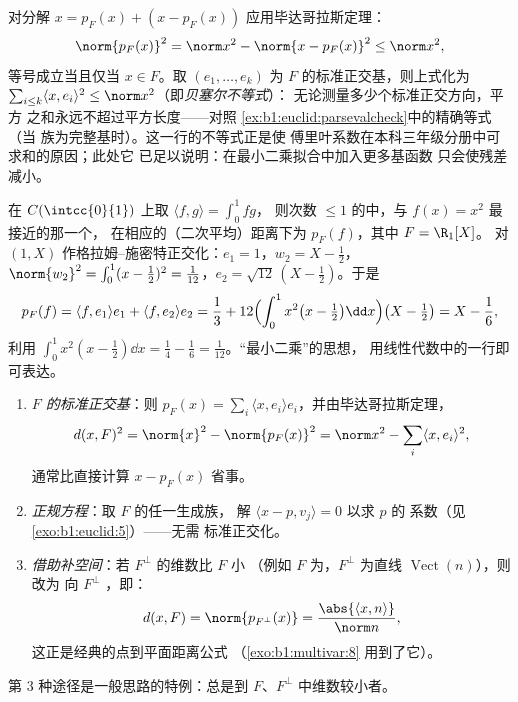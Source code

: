 \begin{example}[投影不会使长度变长]
\label{ex:b1:euclid:bessel}
对分解 $x = p_F(x) + (x - p_F(x))$ 应用毕达哥拉斯定理：
\[
\norm{p_F(x)}^2 = \norm x^2 - \norm{x - p_F(x)}^2 \leq
\norm x^2 ,
\]
等号成立当且仅当 $x \in F$。取 $(e_1,
\dots, e_k)$ 为 $F$ 的标准正交基，则上式化为 $\sum_{i \leq k}\langle x,
e_i\rangle^2 \leq \norm x^2$（即\emph{贝塞尔不等式}）：
无论测量多少个标准正交方向，平方
之和永远不超过平方长度——对照
\cref{ex:b1:euclid:parsevalcheck}中的精确等式（当
族为完整基时）。这一行的不等式正是使
傅里叶系数在本科三年级分册中可求和的原因；此处它
已足以说明：在最小二乘拟合中加入更多基函数
只会使残差减小。
\end{example}

\begin{example}[最佳二次逼近]\label{ex:b1:euclid:bestapprox}
在 $C(\intcc{0}{1})$ 上取 $\langle f, g\rangle = \int_0^1 fg$，
则次数 $\leq 1$ 的中，与 $f(x) = x^2$ 最接近的那一个，
在相应的（二次平均）距离下为 $p_F(f)$，其中 $F = \R_1[X]$。
对 $(1, X)$ 作格拉姆–施密特正交化：$e_1 = 1$，$w_2 = X - \frac12$，
$\norm{w_2}^2 = \int_0^1 (x - \frac12)^2 = \frac{1}{12}$，$e_2 =
\sqrt{12}\,(X - \tfrac12)$。于是
\[
p_F(f) = \langle f, e_1\rangle e_1 + \langle f, e_2\rangle e_2
= \frac13 + 12\Bigl(\int_0^1 x^2\bigl(x - \tfrac12\bigr)\dd
x\Bigr)\bigl(X - \tfrac12\bigr)
= X - \frac{1}{6},
\]
利用 $\int_0^1 x^2(x - \frac12)\dd x = \frac14 - \frac16 =
\frac{1}{12}$。“最小二乘”的思想，
用线性代数中的一行即可表达。
\end{example}

\begin{method}
\label{met:b1:euclid:distance}
\begin{enumerate}
  \item \emph{$F$ 的标准正交基}：则 $p_F(x) = \sum_i
        \langle x, e_i\rangle e_i$，并由毕达哥拉斯定理，
        \[
        d(x, F)^2 = \norm{x}^2 - \norm{p_F(x)}^2
        = \norm x^2 - \sum_i \langle x, e_i\rangle^2 ,
        \]
        通常比直接计算 $x - p_F(x)$ 省事。
  \item \emph{正规方程}：取 $F$ 的任一生成族，
        解 $\langle x - p, v_j\rangle = 0$ 以求 $p$ 的
        系数（见\cref{exo:b1:euclid:5}）——无需
        标准正交化。
  \item \emph{借助补空间}：若 $F^\perp$ 的维数比 $F$ 小
        （例如 $F$ 为，$F^\perp$ 为直线
        $\operatorname{Vect}(n)$），则改为
        向 $F^\perp$ ，即：
        \[
        d(x, F) = \norm{p_{F^\perp}(x)} =
        \frac{\abs{\langle x, n\rangle}}{\norm n} ,
        \]
        这正是经典的点到平面距离公式
        （\cref{exo:b1:multivar:8} 用到了它）。
\end{enumerate}
第 3 种途径是一般思路的特例：总是到
$F$、$F^\perp$ 中维数较小者。
\end{method}

